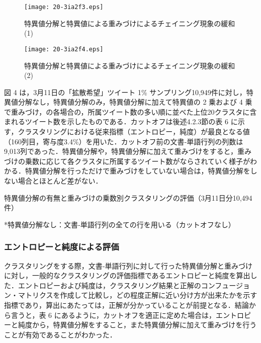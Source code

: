 \documentclass[japanese]{jnlp_1.4}
\begin{document}
\begin{figure}[b]
\begin{center}
\texttt{[image: 20-3ia2f3.eps]}
\end{center}
\caption{特異値分解と特異値による重みづけによるチェイニング現象の緩和 (1)}
\end{figure}
\begin{figure}[b]
\begin{center}
\texttt{[image: 20-3ia2f4.eps]}
\end{center}
\caption{特異値分解と特異値による重みづけによるチェイニング現象の緩和 (2)}
\end{figure}


図 4 は，3月11日の「拡散希望」ツイート 1\% サンプリング10,949件に対し，特異値分解なし，特異値分解のみ，特異値分解に加えて特異値の 2 乗および 4 乗で重みづけ，の各場合の，所属ツイート数の多い順に並べた上位20クラスタに含まれるツイート数を示したものである．カットオフは後述4.2.3節の表 6 に示す，クラスタリングにおける従来指標（エントロピー，純度）が最良となる値（160列目，寄与度3.4\%）を用いた．カットオフ前の文書‐単語行列の列数は9,013列であった．特異値分解や，特異値分解に加えて重みづけをすると，重みづけの乗数に応じて各クラスタに所属するツイート数がならされていく様子がわかる．特異値分解を行っただけで重みづけをしていない場合は，特異値分解をしない場合とほとんど差がない．

\begin{table}[t]
\caption{特異値分解の有無と重みづけの乗数別クラスタリングの評価（3月11日分10,494件）}

\vspace{0.5zw}\small
*特異値分解なし：文書‐単語行列の全ての行を用いる（カットオフなし）\par
\end{table}


\subsubsection{エントロピーと純度による評価}

クラスタリングをする際，文書‐単語行列に対して行った特異値分解と重みづけに対し，一般的なクラスタリングの評価指標であるエントロピーと純度を算出した．エントロピーおよび純度は，クラスタリング結果と正解のコンフュージョン・マトリクスを作成して比較し，どの程度正解に近い分け方が出来たかを示す指標であり，算出にあたっては，正解が分かっていることが前提となる．結論から言うと，表 6 にあるように，カットオフを適正に定めた場合は，エントロピーと純度から，特異値分解をすること，また特異値分解に加えて重みづけを行うことが有効であることがわかった．
\end{document}
